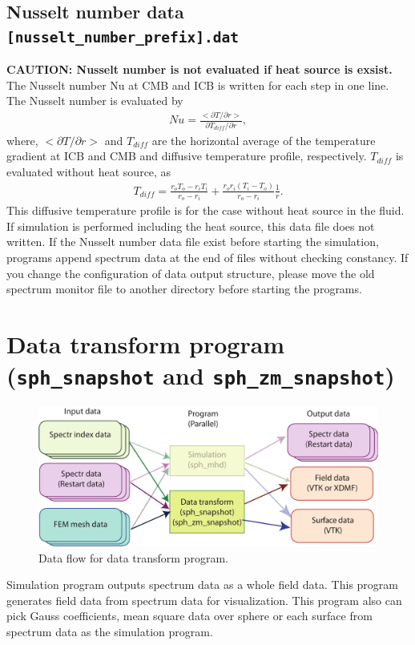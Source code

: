 \subsection{Nusselt number data {\tt [nusselt\_number\_prefix].dat}}
{\bf CAUTION: Nusselt number is not evaluated if heat source is exsist.}
The Nusselt number Nu at CMB and ICB is written for each step in one line. The Nusselt number is evaluated by
%
\begin{eqnarray*}
Nu = \frac{<\partial T / \partial r>}{\partial T_{diff}/ \partial r},
\end{eqnarray*}
where, $<\partial T / \partial r>$ and $T_{diff}$ are the horizontal average of the temperature gradient at ICB and CMB and diffusive temperature profile, respectively. $T_{diff}$ is evaluated without heat source, as
\begin{eqnarray*}
T_{diff} = \frac{r_{o}T_{o} - r_{i}T_{i}}{r_{o} - r_{i}}
    +  \frac{r_{o}r_{i}\left(T_{i} - T_{o}\right)}{r_{o} - r_{i}} \frac{1}{r}.
\end{eqnarray*}
%
This diffusive temperature profile is for the case without heat source in the fluid. If simulation is performed including the heat source, this data file does not written.
If the Nusselt number data file exist before starting the simulation, programs append spectrum data at the end of files without checking constancy. If you change the configuration of data output structure, please move the old spectrum monitor file to another directory before starting the programs.


\newpage
\section{Data transform program \\
({\tt sph\_snapshot} and {\tt sph\_zm\_snapshot})}
\label{section:sph_snapshot}
%
\begin{figure}[htbp]
\begin{center}
\includegraphics*[width=130mm]{images/flow_3}
\end{center}
\caption{Data flow for data transform program.}
\label{fig:flow_3}
\end{figure}
%
Simulation program outputs spectrum data as a whole field data. This program generates field data from spectrum data for visualization. This program also can pick Gauss coefficients, mean square data over sphere or each surface from spectrum data as the simulation program.

